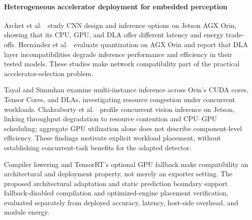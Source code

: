 \paragraph*{Heterogeneous accelerator deployment for embedded perception}
Archet et al.\ \cite{archet2023energy} study CNN design and inference options
on Jetson AGX Orin, showing that its CPU, GPU, and DLA offer different latency
and energy trade-offs. Hern\'andez et al.\ \cite{hernandez2024optimizing}
evaluate quantization on AGX Orin and report that DLA layer incompatibilities
degrade inference performance and efficiency in their tested models.
These studies make network compatibility part of the practical
accelerator-selection problem.

Tayal and Simmhan \cite{tayal2024multiinstance} examine multi-instance inference
across Orin's CUDA cores, Tensor Cores, and DLAs, investigating resource
congestion under concurrent workloads. Chakraborty et al.\
\cite{chakraborty2025profiling} profile concurrent vision inference on Jetson,
linking throughput degradation to resource contention and CPU--GPU scheduling;
aggregate GPU utilization alone does not describe component-level efficiency.
These findings motivate explicit workload placement, without establishing
concurrent-task benefits for the adapted detector.

Compiler lowering \cite{chen2018tvm} and TensorRT's optional GPU fallback
\cite{nvidia_dla_working} make compatibility an architectural and deployment
property, not merely an exporter setting. The proposed architectural adaptation
and static prediction boundary support fallback-disabled compilation and
optimized-engine placement verification, evaluated separately from deployed
accuracy, latency, host-side overhead, and module energy.
